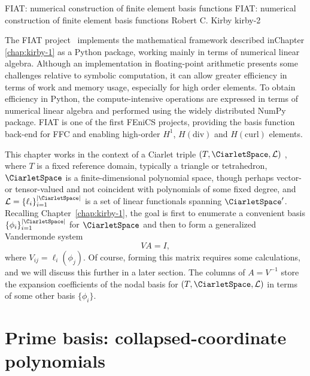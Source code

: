\begingroup

\setcounter{chapter}{12}
\setcounter{chpnum}{12}

              {FIAT: numerical construction of finite element basis functions}
              {FIAT: numerical construction of finite element basis functions}
              {Robert C. Kirby}
              {kirby-2}


The FIAT project~\citep{Kirby2004,Kirby2006} implements the
mathematical framework described in\break Chapter \ref{chap:kirby-1} as a
Python package, working mainly in terms of numerical linear algebra.
Although an implementation in floating-point arithmetic presents some
challenges relative to symbolic computation, it can allow greater
efficiency in terms of work and memory usage, especially for high
order elements. To obtain efficiency in Python, the compute-intensive
operations are expressed in terms of numerical linear algebra and
performed using the widely distributed NumPy package. FIAT is one of
the first FEniCS projects, providing the basis function back-end for
FFC and enabling high-order $H^1$, $H(\mathrm{div})$ and
$H(\mathrm{curl})$ elements.

This chapter works in the context of a Ciarlet triple
$(T,\CiarletSpace,\mathcal{L})$ \citep{Ciarlet2002}, where $T$
is a fixed reference domain, typically a triangle or tetrahedron,
$\CiarletSpace$ is a finite-dimensional polynomial space, though perhaps
vector- or tensor-valued and not coincident with polynomials of some
fixed degree, and  $\mathcal{L} = \{ \ell_i \}_{i=1}^{|\CiarletSpace|}$ is
a set of linear functionals spanning $\CiarletSpace^\prime$.  Recalling
Chapter~\ref{chap:kirby-1}, the goal is first to enumerate a convenient
basis $\{ \phi_i \}_{i=1}^{|\CiarletSpace|}$ for $\CiarletSpace$ and
then to form a generalized Vandermonde system
\begin{equation}
  V A = I,
\end{equation}
where $V_{ij} = \ell_i( \phi_j)$.  Of course, forming this matrix
requires some calculations, and we will discuss this further in a
later section.  The columns of $A = V^{-1}$ store the expansion
coefficients of the nodal basis for $(T,\CiarletSpace,\mathcal{L})$ in
terms of some other basis $\{\phi_i\}$.

\section{Prime basis: collapsed-coordinate polynomials}

